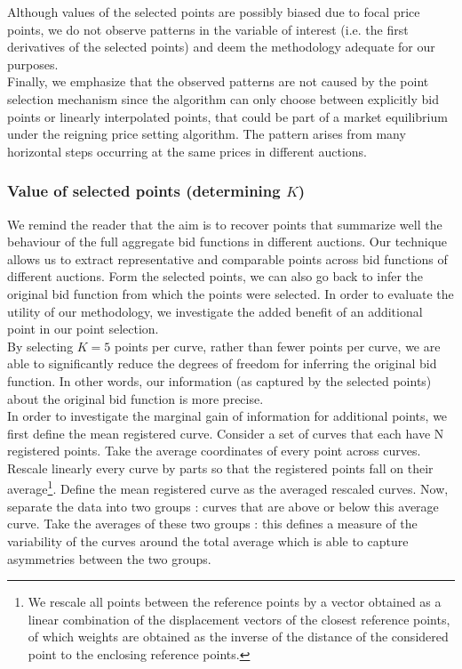 Although values of the selected points are possibly biased due to focal price points, we do not observe patterns in the variable of interest (i.e. the first derivatives of the selected points) and deem the methodology adequate for our purposes. \\

Finally, we emphasize that the observed patterns are not caused by the point selection mechanism since the algorithm can only choose between explicitly bid points or linearly interpolated points, that could be part of a market equilibrium under the reigning price setting algorithm. The pattern arises from many horizontal steps occurring at the same prices in different auctions. 


\subsubsection{Value of selected points (determining $K$)
}
We remind the reader that the aim is to recover points that summarize well the behaviour of the full aggregate bid functions in different auctions. 
Our technique allows us to extract representative and comparable points across bid functions of different auctions. Form the selected points, we can also go back to infer the original bid function from which the points were selected. In order to evaluate the utility of our methodology, we investigate the added benefit of an additional point in our point selection. \\

By selecting $K=5$ points per curve, rather than fewer points per curve, we are able to significantly reduce the degrees of freedom for inferring the original bid function. In other words, our information (as captured by the selected points) about the original bid function is more precise. \\

In order to investigate the marginal gain of information for additional points, we first define the mean registered curve. Consider a set of curves that each have N registered points. Take the average coordinates of every point across curves. Rescale linearly every curve by parts so that the registered points fall on their average\footnote{We rescale all points between the reference points by a vector obtained as a linear combination of the displacement vectors of the closest reference points, of which weights are obtained as the inverse of the distance of the considered point to the enclosing reference points.}. Define the mean registered curve as the averaged rescaled curves. Now, separate the data into two groups : curves that are above or below this average curve. Take the averages of these two groups : this defines a measure of the variability of the curves around the total average which is able to capture asymmetries between the two groups.\\


